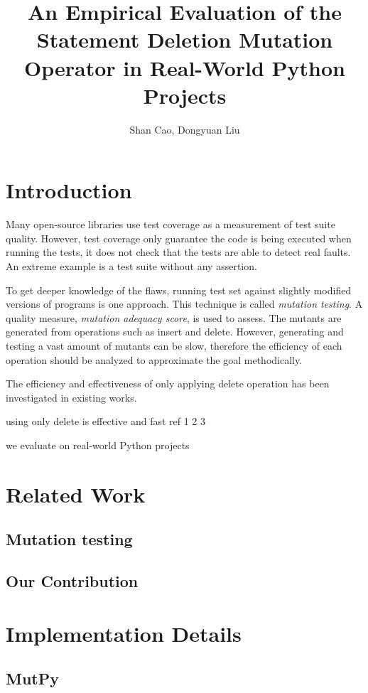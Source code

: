 \documentclass{article}
\title{\textbf{An Empirical Evaluation of the Statement Deletion Mutation Operator in Real-World Python Projects}}
\author{Shan Cao, Dongyuan Liu}
\begin{document}
\maketitle
\tableofcontents

\section{Introduction}

Many open-source libraries use test coverage as a measurement of test suite quality. However, test coverage only guarantee the code is being executed when running the tests, it does not check that the tests are able to detect real faults. An extreme example is a test suite without any assertion.

To get deeper knowledge of the flaws, running test set against slightly modified versions of programs is one approach\cite{}. This technique is called \emph{mutation testing}. A quality measure, \emph{mutation adequacy score}, is used to assess. The mutants are generated from operations such as insert and delete. However, generating and testing a vast amount of mutants can be slow, therefore the efficiency of each operation should be analyzed to approximate the goal methodically.

The efficiency and effectiveness of only applying delete operation has been investigated in existing works.

using only delete is effective and fast ref 1 2 3

we evaluate on real-world Python projects

\section{Related Work}

\subsection{Mutation testing}

\subsection{Our Contribution}

\section{Implementation Details}

\subsection{MutPy}
\end{document}
